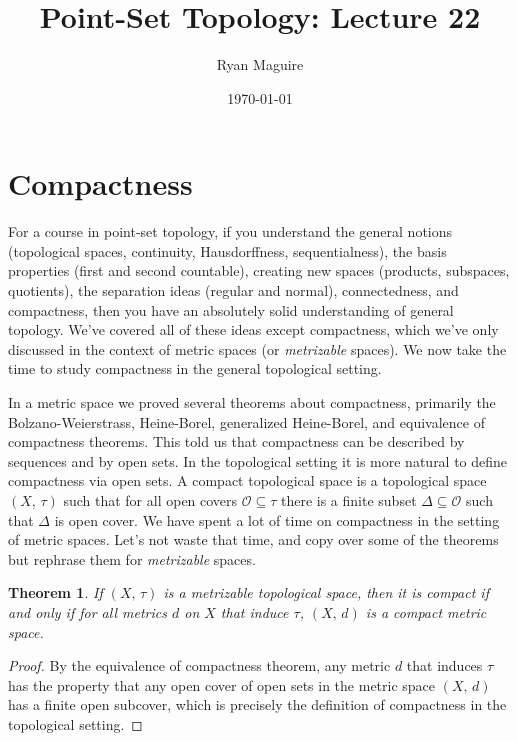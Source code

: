 \documentclass{article}
\title{Point-Set Topology: Lecture 22}
\author{Ryan Maguire}
\date{\today}
\theoremstyle{plain}
\newtheorem{theorem}{Theorem}[section]
\theoremstyle{normal}
\newenvironment{definition}{%
    \pushQED{\qed}\renewcommand{\qedsymbol}{$\blacksquare$}\definitionx%
}{%
    \popQED\enddefinitionx%
}
\begin{document}
    \maketitle
    \section{Compactness}
        For a course in point-set topology, if you understand the general
        notions (topological spaces, continuity, Hausdorffness, sequentialness),
        the basis properties (first and second countable), creating new spaces
        (products, subspaces, quotients), the separation ideas
        (regular and normal), connectedness, and compactness, then you have an
        absolutely solid understanding of general topology. We've covered all
        of these ideas except compactness, which we've only discussed in the
        context of metric spaces (or \textit{metrizable} spaces). We now take
        the time to study compactness in the general topological setting.
        \par\hfill\par
        In a metric space we proved several theorems about compactness,
        primarily the Bolzano-Weierstrass, Heine-Borel, generalized
        Heine-Borel, and equivalence of compactness theorems. This told us
        that compactness can be described by sequences and by open sets. In the
        topological setting it is more natural to define compactness via open
        sets.
        \begin{definition}[\textbf{Compact Topological Space}]
            A compact topological space is a topological space $(X,\,\tau)$
            such that for all open covers $\mathcal{O}\subseteq\tau$ there is
            a finite subset $\Delta\subseteq\mathcal{O}$ such that $\Delta$ is
            open cover.
        \end{definition}
        We have spent a lot of time on compactness in the setting of metric
        spaces. Let's not waste that time, and copy over some of the theorems
        but rephrase them for \textit{metrizable} spaces.
        \begin{theorem}
            If $(X,\,\tau)$ is a metrizable topological space, then it is
            compact if and only if for all metrics $d$ on $X$ that induce
            $\tau$, $(X,\,d)$ is a compact metric space.
        \end{theorem}
        \begin{proof}
            By the equivalence of compactness theorem, any metric $d$ that
            induces $\tau$ has the property that any open cover of open sets
            in the metric space $(X,\,d)$ has a finite open subcover, which is
            precisely the definition of compactness in the topological setting.
        \end{proof}
\end{document}
